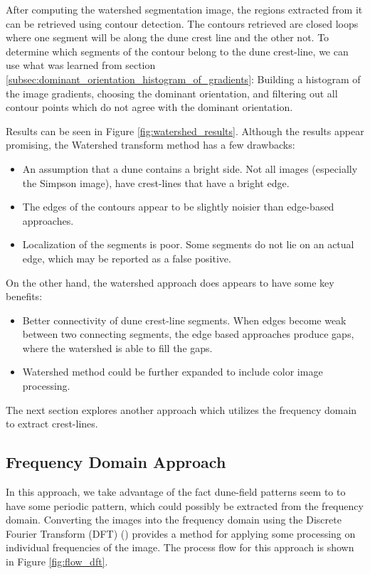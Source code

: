 After computing the watershed segmentation image, the regions extracted from it can be retrieved using contour detection. The contours retrieved are closed loops where one segment will be along the dune crest line and the other not. To determine which segments of the contour belong to the dune crest-line, we can use what was learned from section \ref{subsec:dominant_orientation_histogram_of_gradients}: Building a histogram of the image gradients, choosing the dominant orientation, and filtering out all contour points which do not agree with the dominant orientation. 

Results can be seen in Figure \ref{fig:watershed_results}. Although the results appear promising, the Watershed transform method has a few drawbacks:

\begin{itemize}
	\item An assumption that a dune contains a bright side. Not all images (especially the Simpson image), have crest-lines that have a bright edge.
	\item The edges of the contours appear to be slightly noisier than edge-based approaches.
	\item Localization of the segments is poor. Some segments do not lie on an actual edge, which may be reported as a false positive.
\end{itemize}

On the other hand, the watershed approach does appears to have some key benefits:

\begin{itemize}
	\item Better connectivity of dune crest-line segments. When edges become weak between two connecting segments, the edge based approaches produce gaps, where the watershed is able to fill the gaps.
	\item Watershed method could be further expanded to include color image processing.
\end{itemize}

The next section explores another approach which utilizes the frequency domain to extract crest-lines.


\subsection{Frequency Domain Approach} \label{subsec:frequency_domain_approach}

In this approach, we take advantage of the fact dune-field patterns seem to to have some periodic pattern, which could possibly be extracted from the frequency domain. Converting the images into the frequency domain using the Discrete Fourier Transform (DFT) (\cite{1988_fast_fourier_transform_applications,1969_finite_fourier_transform}) provides a method for applying some processing on individual frequencies of the image. The process flow for this approach is shown in Figure \ref{fig:flow_dft}.

